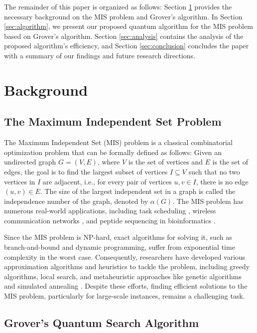 The remainder of this paper is organized as follows: Section \ref{sec:background} provides the necessary background on the MIS problem and Grover's algorithm. In Section \ref{sec:algorithm}, we present our proposed quantum algorithm for the MIS problem based on Grover's algorithm. Section \ref{sec:analysis} contains the analysis of the proposed algorithm's efficiency, and Section \ref{sec:conclusion} concludes the paper with a summary of our findings and future research directions.

\section{Background}
\label{sec:background}

\subsection{The Maximum Independent Set Problem}
\label{subsec:mis_problem}

The Maximum Independent Set (MIS) problem is a classical combinatorial optimization problem that can be formally defined as follows: Given an undirected graph $G = (V, E)$, where $V$ is the set of vertices and $E$ is the set of edges, the goal is to find the largest subset of vertices $I \subseteq V$ such that no two vertices in $I$ are adjacent, i.e., for every pair of vertices $u, v \in I$, there is no edge $(u, v) \in E$. The size of the largest independent set in a graph is called the independence number of the graph, denoted by $\alpha(G)$. The MIS problem has numerous real-world applications, including task scheduling \cite{garey1979computers}, wireless communication networks \cite{haynes1998fundamentals}, and peptide sequencing in bioinformatics \cite{pevzner2000combinatorial}.

Since the MIS problem is NP-hard, exact algorithms for solving it, such as branch-and-bound and dynamic programming, suffer from exponential time complexity in the worst case. Consequently, researchers have developed various approximation algorithms and heuristics to tackle the problem, including greedy algorithms, local search, and metaheuristic approaches like genetic algorithms and simulated annealing \cite{galinier1999hybrid}. Despite these efforts, finding efficient solutions to the MIS problem, particularly for large-scale instances, remains a challenging task.

\subsection{Grover's Quantum Search Algorithm}
\label{subsec:grover_algorithm}

